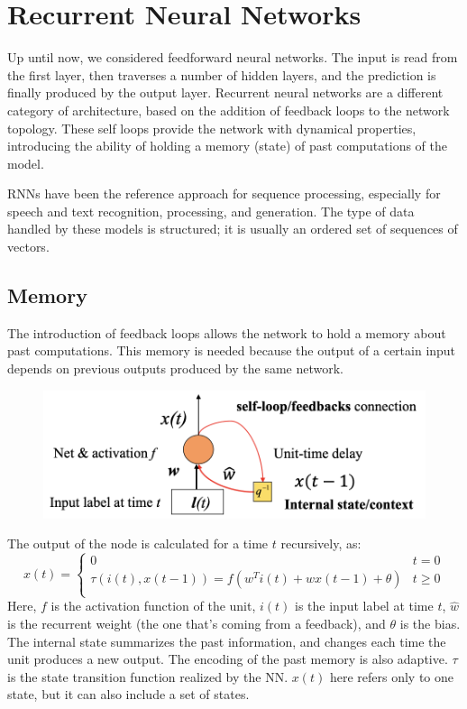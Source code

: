 \chapter{Recurrent Neural Networks}

Up until now, we considered feedforward neural networks. The input is read from the first layer, then traverses a number of hidden layers, and the prediction is finally produced by the output layer. Recurrent neural networks are a different category of architecture, based on the addition of feedback loops to the network topology. These self loops provide the network with dynamical properties, introducing the ability of holding a memory (state) of past computations of the model.

RNNs have been the reference approach for sequence processing, especially for speech and text recognition, processing, and generation. The type of data handled by these models is structured; it is usually an ordered set of sequences of vectors.

\section{Memory}

The introduction of feedback loops allows the network to hold a memory about past computations. This memory is needed because the output of a certain input depends on previous outputs produced by the same network.
\begin{figure}[h]
    \centering
    \includegraphics[width=0.5\linewidth]{img/RNN_unit.png}
\end{figure}

The output of the node is calculated for a time $t$ recursively, as:
\begin{equation*}
    x(t) = \begin{cases}
            0 & t = 0 \\
            \tau(i(t), x(t-1)) = f(w^Ti(t) + \hat{w}x(t-1) + \theta) & t \geq 0 \\
    \end{cases}
\end{equation*}
Here, $f$ is the activation function of the unit, $i(t)$ is the input label at time $t$, $\hat{w}$ is the recurrent weight (the one that's coming from a feedback), and $\theta$ is the bias. The internal state summarizes the past information, and changes each time the unit produces a new output. The encoding of the past memory is also adaptive. $\tau$ is the state transition function realized by the NN. $x(t)$ here refers only to one state, but it can also include a set of states.

